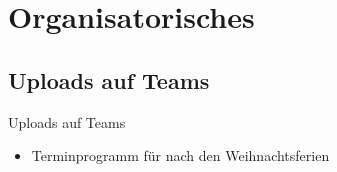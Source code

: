 \section{Organisatorisches}
\BlueSectionSlide

\subsection{Uploads auf Teams}
\begin{frame}{Uploads auf Teams}
    \begin{itemize}
        \item[\textbullet] Terminprogramm für nach den Weihnachtsferien
    \end{itemize}

\end{frame}



\folieFragen


